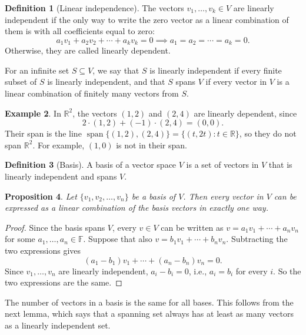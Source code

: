 \documentclass[11pt]{article}
\theoremstyle{definition}
\newtheorem{definition}{Definition}[section]
\newtheorem{example}[definition]{Example}
\theoremstyle{plain}
\newtheorem{proposition}[definition]{Proposition}
\theoremstyle{remark}
\DeclareMathOperator{\Span}{span}
\begin{document}
\begin{definition}[Linear independence]
    The vectors $v_1, \ldots, v_k \in V$ are linearly independent if the only way to write the zero vector as a linear combination of them is with all coefficients equal to zero:
    \[a_1 v_1 + a_2 v_2 + \cdots + a_k v_k = 0 \implies a_1 = a_2 = \cdots = a_k = 0.\]
    Otherwise, they are called linearly dependent.

    For an infinite set $S \subseteq V$, we say that $S$ is linearly independent if every finite subset of $S$ is linearly independent, and that $S$ spans $V$ if every vector in $V$ is a linear combination of finitely many vectors from $S$.
\end{definition}

\begin{example}
    In $\mathbb{R}^2$, the vectors $(1, 2)$ and $(2, 4)$ are linearly dependent, since
    \[2 \cdot (1, 2) + (-1) \cdot (2, 4) = (0, 0).\]
    Their span is the line $\Span\{(1, 2), (2, 4)\} = \{(t, 2t) : t \in \mathbb{R}\}$, so they do not span $\mathbb{R}^2$. For example, $(1, 0)$ is not in their span.
\end{example}

\begin{definition}[Basis]
    A basis of a vector space $V$ is a set of vectors in $V$ that is linearly independent and spans $V$.
\end{definition}

\begin{proposition}\label{prop:unique-rep}
    Let $\{v_1, v_2, \ldots, v_n\}$ be a basis of $V$. Then every vector in $V$ can be expressed as a linear combination of the basis vectors in exactly one way.
\end{proposition}

\begin{proof}
    Since the basis spans $V$, every $v \in V$ can be written as $v = a_1 v_1 + \cdots + a_n v_n$ for some $a_1, \ldots, a_n \in \mathbb{F}$. Suppose that also $v = b_1 v_1 + \cdots + b_n v_n$. Subtracting the two expressions gives
    \[(a_1 - b_1) v_1 + \cdots + (a_n - b_n) v_n = 0.\]
    Since $v_1, \ldots, v_n$ are linearly independent, $a_i - b_i = 0$, i.e., $a_i = b_i$ for every $i$. So the two expressions are the same.
\end{proof}

The number of vectors in a basis is the same for all bases. This follows from the next lemma, which says that a spanning set always has at least as many vectors as a linearly independent set.
\end{document}
